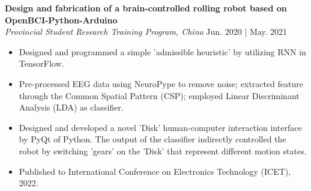 \documentclass[a4paper,9pt]{extarticle}
\begin{document}
\newpage
\noindent
\textbf{Design and fabrication of a brain-controlled rolling robot based on OpenBCI-Python-Arduino} \\ %
\textit{Provincial Student Research Training Program, China} \hfill Jun. 2020 | May. 2021 %
\begin{itemize}
    \item Designed and programmed a simple 'admissible heuristic' by utilizing RNN in TensorFlow.
    \item Pre-processed EEG data using NeuroPype to remove noise; extracted feature through the Common Spatial Pattern (CSP); employed Linear Discriminant Analysis (LDA) as classifier.
    \item Designed and developed a novel 'Disk' human-computer interaction interface by PyQt of Python. The output of the classifier indirectly controlled the robot by switching 'gears' on the 'Disk' that represent different motion states.
    \item Published to International Conference on Electronics Technology (ICET), 2022.
\end{itemize}
\end{document}
